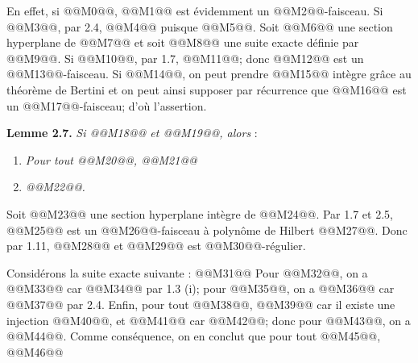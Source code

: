 
En
effet, si @@M0@@, @@M1@@ est évidemment un @@M2@@-faisceau. Si @@M3@@, par 2.4, @@M4@@ puisque @@M5@@. Soit @@M6@@ une section hyperplane de @@M7@@ et soit @@M8@@ une suite exacte définie par @@M9@@. Si @@M10@@, par 1.7, @@M11@@; donc @@M12@@ est un @@M13@@-faisceau. Si @@M14@@, on peut prendre @@M15@@ intègre grâce au théorème de Bertini et on peut ainsi supposer par récurrence que @@M16@@ est un @@M17@@-faisceau; d'où l'assertion.

\textbf{Lemme 2.7.} \emph{Si @@M18@@ et @@M19@@, alors} :
\begin{enumerate}[label=(\roman*)]
\item \emph{Pour tout @@M20@@, @@M21@@}
\item \emph{@@M22@@.}
\end{enumerate}

Soit @@M23@@ une section hyperplane intègre de @@M24@@. Par 1.7 et 2.5, @@M25@@ est un @@M26@@-faisceau à polynôme de Hilbert @@M27@@. Donc par 1.11, @@M28@@ et @@M29@@ est @@M30@@-régulier.

Considérons la suite exacte suivante :
@@M31@@
Pour @@M32@@, on a @@M33@@ car @@M34@@ par 1.3 (i); pour @@M35@@, on a @@M36@@ car @@M37@@ par 2.4. Enfin, pour tout @@M38@@, @@M39@@ car il existe une injection @@M40@@, et @@M41@@ car @@M42@@; donc pour @@M43@@, on a @@M44@@. Comme conséquence, on en conclut que pour tout @@M45@@,
@@M46@@

